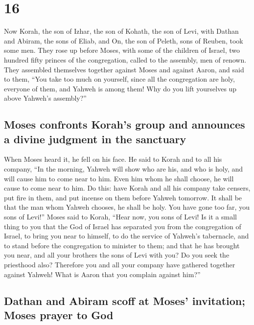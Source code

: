\hypertarget{section-15}{%
\section{16}\label{section-15}}

 Now Korah, the son of Izhar, the son of Kohath, the son
of Levi, with Dathan and Abiram, the sons of Eliab, and On, the son of
Peleth, sons of Reuben, took some men.  They rose up
before Moses, with some of the children of Israel, two hundred fifty
princes of the congregation, called to the assembly, men of renown.
 They assembled themselves together against Moses and
against Aaron, and said to them, ``You take too much on yourself, since
all the congregation are holy, everyone of them, and Yahweh is among
them! Why do you lift yourselves up above Yahweh's assembly?''

\hypertarget{moses-confronts-korahs-group-and-announces-a-divine-judgment-in-the-sanctuary}{%
\subsection{Moses confronts Korah's group and announces a divine
judgment in the
sanctuary}\label{moses-confronts-korahs-group-and-announces-a-divine-judgment-in-the-sanctuary}}

 When Moses heard it, he fell on his face. 
He said to Korah and to all his company, ``In the morning, Yahweh will
show who are his, and who is holy, and will cause him to come near to
him. Even him whom he shall choose, he will cause to come near to him.
 Do this: have Korah and all his company take censers,
 put fire in them, and put incense on them before Yahweh
tomorrow. It shall be that the man whom Yahweh chooses, he shall be
holy. You have gone too far, you sons of Levi!''  Moses
said to Korah, ``Hear now, you sons of Levi!  Is it a
small thing to you that the God of Israel has separated you from the
congregation of Israel, to bring you near to himself, to do the service
of Yahweh's tabernacle, and to stand before the congregation to minister
to them;  and that he has brought you near, and all your
brothers the sons of Levi with you? Do you seek the priesthood also?
 Therefore you and all your company have gathered
together against Yahweh! What is Aaron that you complain against him?''

\hypertarget{dathan-and-abiram-scoff-at-moses-invitation-moses-prayer-to-god}{%
\subsection{Dathan and Abiram scoff at Moses' invitation; Moses prayer
to
God}\label{dathan-and-abiram-scoff-at-moses-invitation-moses-prayer-to-god}}

